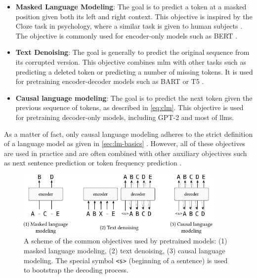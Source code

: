 {\begin{itemize}
    \item \textbf{Masked Language Modeling}: The goal is to predict a token at a masked position given both its left and right context. This objective is inspired by the Cloze task in psychology, where a similar task is given to human subjects \cite{taylor1953cloze}. The objective is commonly used for encoder-only models such as BERT \cite{devlinBERTPretrainingDeep2019}.
    \item \textbf{Text Denoising}: The goal is generally to predict the original sequence from its corrupted version. This objective combines \ac{mlm} with other tasks such as predicting a deleted token or predicting a number of missing tokens. It is used for pretraining encoder-decoder models such as BART \cite{lewisBARTDenoisingSequencetoSequence2019} or T5 \cite{raffelExploringLimitsTransfer2019}.
    \item \textbf{Causal language modeling}: The goal is to predict the next token given the previous sequence of tokens, as described in \autoref{eq:clm}. This objective is used for pretraining decoder-only models, including GPT-2 \cite{radford2019language} and most of \acp{llm}.
\end{itemize}

As a matter of fact, only causal language modeling adheres to the strict definition of a language model as given in \autoref{sec:lm-basics} \cite{cotterell2024formal}. However, all of these objectives are used in practice and are often combined with other auxiliary objectives such as next sentence prediction or token frequency prediction \cite{aroca2020losses}.

\begin{figure}[t]
    \centering
    \includegraphics[width=0.9\textwidth]{img/objectives.pdf}
    \caption{A scheme of the common objectives used by pretrained models: (1) masked language modeling, (2) text denoising, (3)  causal language modeling. The special symbol \texttt{<s>} (beginning of a sentence) is used to bootstrap the decoding process.}\label{fig:objectives}
\end{figure}


}
